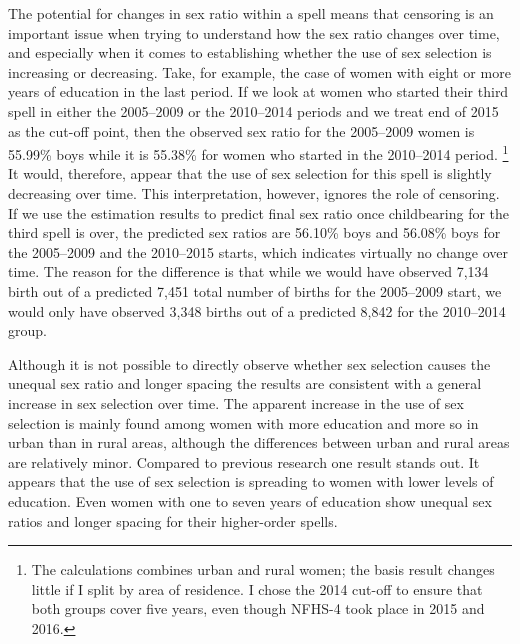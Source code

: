 \documentclass[12pt,letterpaper]{article}
\begin{document}
The potential for changes in sex ratio within a spell means that
censoring is an important issue when trying to understand how the sex
ratio changes over time, and especially when it comes to establishing
whether the use of sex selection is increasing or decreasing.
Take, for example, the case of women with eight or more years of
education in the last period. 
If we look at women who started their third spell in either the
2005--2009 or the 2010--2014 periods and we treat end of 2015
as the cut-off point, then the observed sex ratio for the 2005--2009
women is 55.99\% boys while it is 55.38\% for women who started 
in the 2010--2014 period.%
\footnote{
The calculations combines urban and rural women; the basis result 
changes little if I split by area of residence.
I chose the 2014 cut-off to ensure that both groups cover 
five years, even though NFHS-4 took place in 2015 and 2016.
}
It would, therefore, appear that the use of sex selection for
this spell is slightly decreasing over time.
This interpretation, however, ignores the role of censoring.
If we use the estimation results to predict final sex ratio
once childbearing for the third spell is over, the predicted
sex ratios are 56.10\% boys and 56.08\% boys for the 
2005--2009 and the 2010--2015 starts, which indicates
virtually no change over time.
The reason for the difference is that while we would have 
observed 7,134 birth out of a predicted 7,451 total number 
of births for the 2005--2009 start, we would only have observed 
3,348 births out of a predicted 8,842 for the 2010--2014 group.


Although it is not possible to directly observe whether sex selection
causes the unequal sex ratio and longer spacing the results are
consistent with a general increase in sex selection over time. 
The apparent increase in the use of sex selection is mainly found among
women with more education and more so in urban than in rural areas,
although the differences between urban and rural areas are relatively
minor. 
Compared to previous research one result stands out. 
It appears that the use of sex selection is spreading to women with lower 
levels of education.
Even women with one to seven years of education show unequal sex ratios 
and longer spacing for their higher-order spells.
\end{document}
